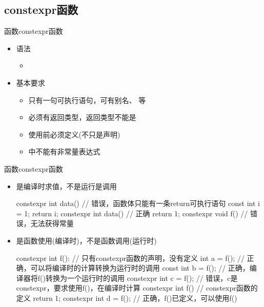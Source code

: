 \subsection[constexpr函数]{constexpr函数}
\begin{frame}[fragile]{函数}{constexpr函数}
  \stretchon
  \begin{itemize}
  \item 语法
    \begin{itemize}
    \item {}
    \end{itemize}
  \item 基本要求
    \begin{itemize}
    \item 只有一句可执行语句，可有别名、
      等
    \item 必须有返回类型，返回类型不能是
    \item 使用前必须定义(不只是声明)
    \item {}中不能有非常量表达式
    \end{itemize}
  \end{itemize}
  \stretchoff
\end{frame}

\begin{frame}[fragile]{函数}{constexpr函数}
  \stretchon
  \begin{itemize}
  \item 是编译时求值，不是运行是调用\\[-1.5ex]
    \begin{cppcode}
constexpr int data() // 错误，函数体只能有一条return可执行语句
{
  const int i = 1;
  return i;
}
constexpr int data() // 正确
{
  return 1;
}
constexpr void f()   // 错误，无法获得常量
{
}
    \end{cppcode}
  \item 是函数使用(\alert{编译时})，不是函数调用(\alert{运行时})\\[-1.5ex]
    \begin{cppcode}
constexpr int f();     // 只有constexpr函数的声明，没有定义
int a = f();           // 正确，可以将编译时的计算转换为运行时的调用
const int b = f();     // 正确，编译器将f()转换为一个运行时的调用
constexpr int c = f(); // 错误，c是constexpr，要求使用f()，在编译时计算
constexpr int f()      // constexpr函数的定义
{
  return 1;
}
constexpr int d = f(); // 正确，f()已定义，可以使用f()
    \end{cppcode}
  \end{itemize}
  \stretchoff
\end{frame}

